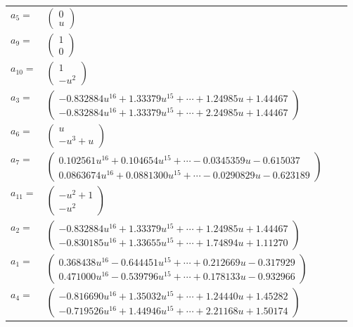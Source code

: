 \documentclass[1p]{elsarticle_modified}
\theoremstyle{definition}
\begin{document}
\begin{tabular}{m{7pt} m{180pt} m{7pt} m{180pt} }
\flushright $a_{5}=$&$\begin{pmatrix}0\\u\end{pmatrix}$ \\
\flushright $a_{9}=$&$\begin{pmatrix}1\\0\end{pmatrix}$ \\
\flushright $a_{10}=$&$\begin{pmatrix}1\\- u^2\end{pmatrix}$ \\
\flushright $a_{3}=$&$\begin{pmatrix}-0.832884 u^{16}+1.33379 u^{15}+\cdots+1.24985 u+1.44467\\-0.832884 u^{16}+1.33379 u^{15}+\cdots+2.24985 u+1.44467\end{pmatrix}$ \\
\flushright $a_{6}=$&$\begin{pmatrix}u\\- u^3+u\end{pmatrix}$ \\
\flushright $a_{7}=$&$\begin{pmatrix}0.102561 u^{16}+0.104654 u^{15}+\cdots-0.0345359 u-0.615037\\0.0863674 u^{16}+0.0881300 u^{15}+\cdots-0.0290829 u-0.623189\end{pmatrix}$ \\
\flushright $a_{11}=$&$\begin{pmatrix}- u^2+1\\- u^2\end{pmatrix}$ \\
\flushright $a_{2}=$&$\begin{pmatrix}-0.832884 u^{16}+1.33379 u^{15}+\cdots+1.24985 u+1.44467\\-0.830185 u^{16}+1.33655 u^{15}+\cdots+1.74894 u+1.11270\end{pmatrix}$ \\
\flushright $a_{1}=$&$\begin{pmatrix}0.368438 u^{16}-0.644451 u^{15}+\cdots+0.212669 u-0.317929\\0.471000 u^{16}-0.539796 u^{15}+\cdots+0.178133 u-0.932966\end{pmatrix}$ \\
\flushright $a_{4}=$&$\begin{pmatrix}-0.816690 u^{16}+1.35032 u^{15}+\cdots+1.24440 u+1.45282\\-0.719526 u^{16}+1.44946 u^{15}+\cdots+2.21168 u+1.50174\end{pmatrix}$ \\

\end{tabular}
\end{document}
